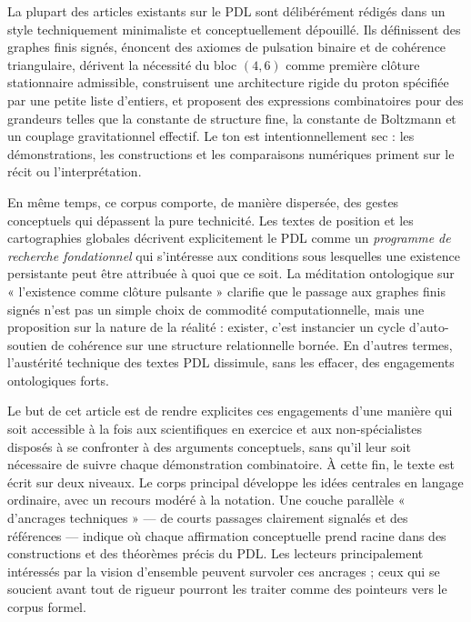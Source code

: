 \documentclass[11pt,a4paper]{article}
\theoremstyle{definition}
\begin{document}
La plupart des articles existants sur le PDL sont délibérément rédigés dans un style techniquement minimaliste et conceptuellement dépouillé.\cite{Laubscher_EmergencePhysicalReality_2024,Laubscher_MinimalClosures_46_2024,Laubscher_ProtonArch_v2_2024,Laubscher_Alpha_v2_2024,Laubscher_EffectiveFields_2024,Laubscher_CavityModes_PDL_2024} Ils définissent des graphes finis signés, énoncent des axiomes de pulsation binaire et de cohérence triangulaire, dérivent la nécessité du bloc \((4,6)\) comme première clôture stationnaire admissible, construisent une architecture rigide du proton spécifiée par une petite liste d’entiers, et proposent des expressions combinatoires pour des grandeurs telles que la constante de structure fine, la constante de Boltzmann et un couplage gravitationnel effectif. Le ton est intentionnellement sec : les démonstrations, les constructions et les comparaisons numériques priment sur le récit ou l’interprétation.

En même temps, ce corpus comporte, de manière dispersée, des gestes conceptuels qui dépassent la pure technicité. Les textes de position et les cartographies globales décrivent explicitement le PDL comme un \emph{programme de recherche fondationnel} qui s’intéresse aux conditions sous lesquelles une existence persistante peut être attribuée à quoi que ce soit.\cite{Laubscher_PDL_Position_2024,Laubscher_PDL_GlobalMapping_v6_2024} La méditation ontologique sur « l’existence comme clôture pulsante » clarifie que le passage aux graphes finis signés n’est pas un simple choix de commodité computationnelle, mais une proposition sur la nature de la réalité : exister, c’est instancier un cycle d’auto-soutien de cohérence sur une structure relationnelle bornée.\cite{Laubscher_Existence_PulsatingClosure_2026} En d’autres termes, l’austérité technique des textes PDL dissimule, sans les effacer, des engagements ontologiques forts.

Le but de cet article est de rendre explicites ces engagements d’une manière qui soit accessible à la fois aux scientifiques en exercice et aux non-spécialistes disposés à se confronter à des arguments conceptuels, sans qu’il leur soit nécessaire de suivre chaque démonstration combinatoire. À cette fin, le texte est écrit sur deux niveaux. Le corps principal développe les idées centrales en langage ordinaire, avec un recours modéré à la notation. Une couche parallèle « d’ancrages techniques » — de courts passages clairement signalés et des références — indique où chaque affirmation conceptuelle prend racine dans des constructions et des théorèmes précis du PDL. Les lecteurs principalement intéressés par la vision d’ensemble peuvent survoler ces ancrages ; ceux qui se soucient avant tout de rigueur pourront les traiter comme des pointeurs vers le corpus formel.
\end{document}
